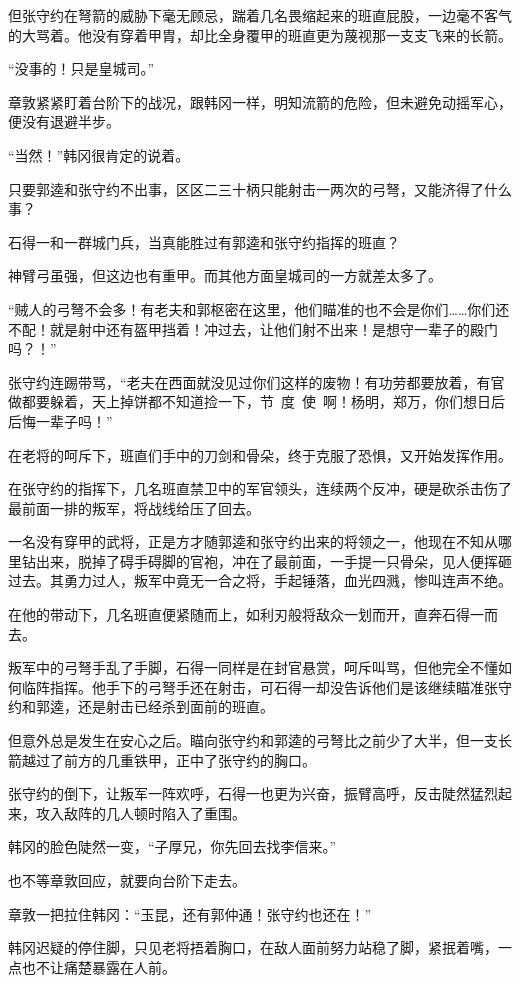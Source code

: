 但张守约在弩箭的威胁下毫无顾忌，踹着几名畏缩起来的班直屁股，一边毫不客气的大骂着。他没有穿着甲胄，却比全身覆甲的班直更为蔑视那一支支飞来的长箭。

“没事的！只是皇城司。”

章敦紧紧盯着台阶下的战况，跟韩冈一样，明知流箭的危险，但未避免动摇军心，便没有退避半步。

“当然！”韩冈很肯定的说着。

只要郭逵和张守约不出事，区区二三十柄只能射击一两次的弓弩，又能济得了什么事？

石得一和一群城门兵，当真能胜过有郭逵和张守约指挥的班直？

神臂弓虽强，但这边也有重甲。而其他方面皇城司的一方就差太多了。

“贼人的弓弩不会多！有老夫和郭枢密在这里，他们瞄准的也不会是你们……你们还不配！就是射中还有盔甲挡着！冲过去，让他们射不出来！是想守一辈子的殿门吗？！”

张守约连踢带骂，“老夫在西面就没见过你们这样的废物！有功劳都要放着，有官做都要躲着，天上掉饼都不知道捡一下，节~度~使~啊！杨明，郑万，你们想日后后悔一辈子吗！”

在老将的呵斥下，班直们手中的刀剑和骨朵，终于克服了恐惧，又开始发挥作用。

在张守约的指挥下，几名班直禁卫中的军官领头，连续两个反冲，硬是砍杀击伤了最前面一排的叛军，将战线给压了回去。

一名没有穿甲的武将，正是方才随郭逵和张守约出来的将领之一，他现在不知从哪里钻出来，脱掉了碍手碍脚的官袍，冲在了最前面，一手提一只骨朵，见人便挥砸过去。其勇力过人，叛军中竟无一合之将，手起锤落，血光四溅，惨叫连声不绝。

在他的带动下，几名班直便紧随而上，如利刃般将敌众一划而开，直奔石得一而去。

叛军中的弓弩手乱了手脚，石得一同样是在封官悬赏，呵斥叫骂，但他完全不懂如何临阵指挥。他手下的弓弩手还在射击，可石得一却没告诉他们是该继续瞄准张守约和郭逵，还是射击已经杀到面前的班直。

但意外总是发生在安心之后。瞄向张守约和郭逵的弓弩比之前少了大半，但一支长箭越过了前方的几重铁甲，正中了张守约的胸口。

张守约的倒下，让叛军一阵欢呼，石得一也更为兴奋，振臂高呼，反击陡然猛烈起来，攻入敌阵的几人顿时陷入了重围。

韩冈的脸色陡然一变，“子厚兄，你先回去找李信来。”

也不等章敦回应，就要向台阶下走去。

章敦一把拉住韩冈：“玉昆，还有郭仲通！张守约也还在！”

韩冈迟疑的停住脚，只见老将捂着胸口，在敌人面前努力站稳了脚，紧抿着嘴，一点也不让痛楚暴露在人前。

